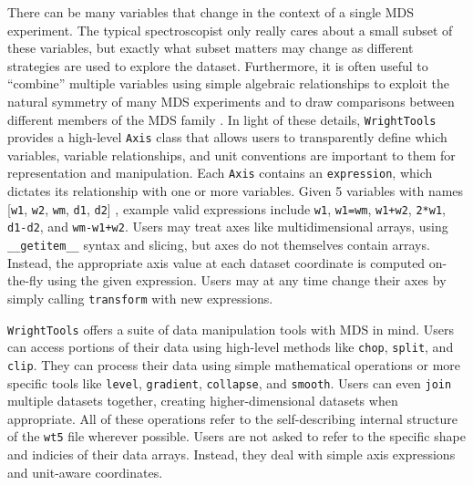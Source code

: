There can be many variables that change in the context of a single MDS
experiment. The typical spectroscopist only really cares about a small
subset of these variables, but exactly what subset matters may change as
different strategies are used to explore the dataset. Furthermore, it is
often useful to ``combine'' multiple variables using simple algebraic
relationships to exploit the natural symmetry of many MDS experiments
and to draw comparisons between different members of the MDS family
\cite{NeffMallonNathanA2017a}. In light of these details,
\texttt{WrightTools} provides a high-level \texttt{Axis} class that
allows users to transparently define which variables, variable
relationships, and unit conventions are important to them for
representation and manipulation. Each \texttt{Axis} contains an
\texttt{expression}, which dictates its relationship with one or more
variables. Given 5 variables with names
{[}\texttt{\textquotesingle{}w1\textquotesingle{}},
\texttt{\textquotesingle{}w2\textquotesingle{}},
\texttt{\textquotesingle{}wm\textquotesingle{}},
\texttt{\textquotesingle{}d1\textquotesingle{}},
\texttt{\textquotesingle{}d2\textquotesingle{}}{]} , example valid
expressions include \texttt{\textquotesingle{}w1\textquotesingle{}},
\texttt{\textquotesingle{}w1=wm\textquotesingle{}},
\texttt{\textquotesingle{}w1+w2\textquotesingle{}},
\texttt{\textquotesingle{}2*w1\textquotesingle{}},
\texttt{\textquotesingle{}d1-d2\textquotesingle{}}, and
\texttt{\textquotesingle{}wm-w1+w2\textquotesingle{}}. Users may treat
axes like multidimensional arrays, using \texttt{\_\_getitem\_\_} syntax
and slicing, but axes do not themselves contain arrays. Instead, the
appropriate axis value at each dataset coordinate is computed on-the-fly
using the given expression. Users may at any time change their axes by
simply calling \texttt{transform} with new expressions.

\texttt{WrightTools} offers a suite of data manipulation tools with MDS
in mind. Users can access portions of their data using high-level
methods like \texttt{chop}, \texttt{split}, and \texttt{clip}. They can
process their data using simple mathematical operations or more specific
tools like \texttt{level}, \texttt{gradient}, \texttt{collapse}, and
\texttt{smooth}. Users can even \texttt{join} multiple datasets
together, creating higher-dimensional datasets when appropriate. All of
these operations refer to the self-describing internal structure of the
\texttt{wt5} file wherever possible. Users are not asked to refer to the
specific shape and indicies of their data arrays. Instead, they deal
with simple axis expressions and unit-aware coordinates.

